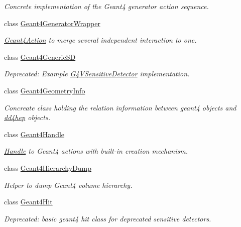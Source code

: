 \begin{DoxyCompactItemize}
\begin{DoxyCompactList}\small\item\em Concrete implementation of the Geant4 generator action sequence. \end{DoxyCompactList}\item 
class \hyperlink{class_d_d4hep_1_1_simulation_1_1_geant4_generator_wrapper}{Geant4\+Generator\+Wrapper}
\begin{DoxyCompactList}\small\item\em \hyperlink{class_d_d4hep_1_1_simulation_1_1_geant4_action}{Geant4\+Action} to merge several independent interaction to one. \end{DoxyCompactList}\item 
class \hyperlink{class_d_d4hep_1_1_simulation_1_1_geant4_generic_s_d}{Geant4\+Generic\+SD}
\begin{DoxyCompactList}\small\item\em Deprecated\+: Example \hyperlink{class_g4_v_sensitive_detector}{G4\+V\+Sensitive\+Detector} implementation. \end{DoxyCompactList}\item 
class \hyperlink{class_d_d4hep_1_1_simulation_1_1_geant4_geometry_info}{Geant4\+Geometry\+Info}
\begin{DoxyCompactList}\small\item\em Concreate class holding the relation information between geant4 objects and \hyperlink{namespacedd4hep}{dd4hep} objects. \end{DoxyCompactList}\item 
class \hyperlink{class_d_d4hep_1_1_simulation_1_1_geant4_handle}{Geant4\+Handle}
\begin{DoxyCompactList}\small\item\em \hyperlink{class_d_d4hep_1_1_handle}{Handle} to Geant4 actions with built-\/in creation mechanism. \end{DoxyCompactList}\item 
class \hyperlink{class_d_d4hep_1_1_simulation_1_1_geant4_hierarchy_dump}{Geant4\+Hierarchy\+Dump}
\begin{DoxyCompactList}\small\item\em Helper to dump Geant4 volume hierarchy. \end{DoxyCompactList}\item 
class \hyperlink{class_d_d4hep_1_1_simulation_1_1_geant4_hit}{Geant4\+Hit}
\begin{DoxyCompactList}\small\item\em Deprecated\+: basic geant4 hit class for deprecated sensitive detectors. \end{DoxyCompactList}\item 

\end{DoxyCompactItemize}
